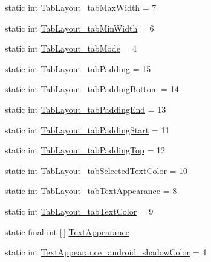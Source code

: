 \begin{DoxyCompactItemize}
\item 
static int \hyperlink{classandroid_1_1support_1_1design_1_1R_1_1styleable_af4f364340f303b8dbcdc26f58bd5fb41}{Tab\+Layout\+\_\+tab\+Max\+Width} = 7
\item 
static int \hyperlink{classandroid_1_1support_1_1design_1_1R_1_1styleable_a5409f5cd527dbb046dbf6c0b239045f1}{Tab\+Layout\+\_\+tab\+Min\+Width} = 6
\item 
static int \hyperlink{classandroid_1_1support_1_1design_1_1R_1_1styleable_a1792137b082bddced52c3c6742bc02f7}{Tab\+Layout\+\_\+tab\+Mode} = 4
\item 
static int \hyperlink{classandroid_1_1support_1_1design_1_1R_1_1styleable_add60aab90e40a18e99ddd5db07708466}{Tab\+Layout\+\_\+tab\+Padding} = 15
\item 
static int \hyperlink{classandroid_1_1support_1_1design_1_1R_1_1styleable_a88bec9e2eb895346151cb36bc599871c}{Tab\+Layout\+\_\+tab\+Padding\+Bottom} = 14
\item 
static int \hyperlink{classandroid_1_1support_1_1design_1_1R_1_1styleable_ab963ac8c82c085a0a654975e88afb71b}{Tab\+Layout\+\_\+tab\+Padding\+End} = 13
\item 
static int \hyperlink{classandroid_1_1support_1_1design_1_1R_1_1styleable_af09be2b7a72af9b14738fc83b314b129}{Tab\+Layout\+\_\+tab\+Padding\+Start} = 11
\item 
static int \hyperlink{classandroid_1_1support_1_1design_1_1R_1_1styleable_a266ce11736ecf5a362936eddab89acd3}{Tab\+Layout\+\_\+tab\+Padding\+Top} = 12
\item 
static int \hyperlink{classandroid_1_1support_1_1design_1_1R_1_1styleable_a7cb7d0e87c86773cc262cd3f36706eef}{Tab\+Layout\+\_\+tab\+Selected\+Text\+Color} = 10
\item 
static int \hyperlink{classandroid_1_1support_1_1design_1_1R_1_1styleable_a79348bc9ddfecdbdc92dcc36d85832b2}{Tab\+Layout\+\_\+tab\+Text\+Appearance} = 8
\item 
static int \hyperlink{classandroid_1_1support_1_1design_1_1R_1_1styleable_afae09ccec67f90fecb5707a8dd509451}{Tab\+Layout\+\_\+tab\+Text\+Color} = 9
\item 
static final int \mbox{[}$\,$\mbox{]} \hyperlink{classandroid_1_1support_1_1design_1_1R_1_1styleable_a23dc46ec989f92f528b46568dad7e726}{Text\+Appearance}
\item 
static int \hyperlink{classandroid_1_1support_1_1design_1_1R_1_1styleable_a893f65ffb93f1abcb29dbaeac41edea4}{Text\+Appearance\+\_\+android\+\_\+shadow\+Color} = 4
\item 

\end{DoxyCompactItemize}
